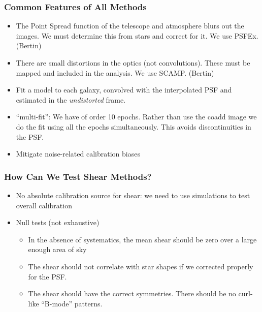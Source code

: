\documentclass{beamer}
\begin{document}
\frame
{
    \frametitle{Common Features of All Methods}

    \begin{itemize}
        
        \item The Point Spread function of the telescope and atmosphere blurs
            out the images.  We must determine this from stars and correct for it.
            We use PSFEx. (Bertin)
        
        \item There are small distortions in the optics (not convolutions).
            These must be mapped and included in the analysis.
            We use SCAMP. (Bertin)

        \item Fit a model to each galaxy, convolved with the interpolated PSF
            and estimated in the {\it undistorted} frame.

        \item ``multi-fit'': We have of order 10 epochs.  Rather than use the coadd image
            we do the fit using all the epochs simultaneously.  This avoids
            discontinuities in the PSF.

        \item Mitigate noise-related calibration biases

    \end{itemize}
}

\frame
{
    \frametitle{How Can We Test Shear Methods?}

    \begin{itemize}

        \item No absolute calibration source for shear: we need to use
            simulations to test overall calibration

        \item Null tests (not exhaustive)

            \begin{itemize}

                \item In the absence of systematics, the mean shear should be
                    zero over a large enough area of sky

                \item The shear should not correlate with star shapes if we
                    corrected properly for the PSF.

                \item The shear should have the correct symmetries.  There
                    should be no curl-like ``B-mode'' patterns.

            \end{itemize}

    \end{itemize}
}
\end{document}
